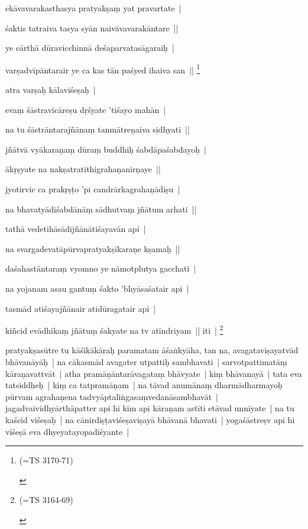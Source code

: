 \documentclass[article,12pt,a4paper]{memoir}
\begin{document}
	  \pstart ekāvavarakasthasya pratyakṣaṃ yat pravartate | 
	\pend
      

	  \pstart śaktis tatraiva tasya syān naivāvavarakāntare || 
	\pend
      

	  \pstart ye cārthā dūravicchinnā deśaparvatasāgaraiḥ | 
	\pend
      

	  \pstart varṣadvīpāntarair ye ca kas tān paśyed ihaiva san || \footnote{\begin{english}(=TS 3170-71)\end{english}}
	\pend
      

	  \pstart atra varṣaḥ kālaviśeṣaḥ | 
	\pend
      

	  \pstart evaṃ śāstravicāreṣu dṛśyate 'tiśayo mahān | 
	\pend
      

	  \pstart na tu śāstrāntarajñānaṃ tanmātreṇaiva sidhyati || 
	\pend
      

	  \pstart jñātvā vyākaraṇaṃ dūraṃ buddhiḥ śabdāpaśabdayoḥ | 
	\pend
      

	  \pstart ākṛṣyate na nakṣatratithigrahaṇanirṇaye || 
	\pend
      

	  \pstart jyotirvic ca prakṛṣṭo 'pi candrārkagrahaṇādiṣu | 
	\pend
      

	  \pstart na bhavatyādiśabdānāṃ sādhutvaṃ jñātum arhati || 
	\pend
      

	  \pstart tathā vedetihāsādijñānātiśayavān api | 
	\pend
      

	  \pstart na svargadevatāpūrvapratyakṣīkaraṇe kṣamaḥ || 
	\pend
      

	  \pstart daśahastāntaraṃ vyomno ye nāmotplutya gacchati | 
	\pend
      

	  \pstart na yojanam asau gantuṃ śakto 'bhyāsaśatair api | 
	\pend
      

	  \pstart tasmād atiśayajñānair atidūragatair api | 
	\pend
      

	  \pstart kiñcid evādhikaṃ jñātuṃ śakyate na tv atīndriyam || iti | \footnote{\begin{english}(=TS 3164-69)\end{english}}
	\pend
      

	  \pstart pratyakṣasūtre tu kāśikākāraḥ paramatam āśaṅkyāha, tan na, avagataviṣayatvād bhāvanāyāḥ | na cākasmād avagater utpattiḥ sambhavati | sarvotpattimatāṃ kāraṇavattvāt | atha pramāṇāntarāvagataṃ bhāvyate | kiṃ bhāvanayā | tata eva tatsiddheḥ | kiṃ ca tatpramāṇam | na tāvad anumānaṃ dharmādharmayoḥ pūrvam agrahaṇena tadvyāptaliṅgasaṃvedanāsambhavāt | jagadvaividhyārthāpatter api hi kim api kāraṇam astīti etāvad unnīyate | na tu kaścid viśeṣaḥ | na cānirdiṣṭaviśeṣaviṣayā bhāvanā bhavati | yogaśāstreṣv api hi viśeṣā eva dhyeyatayopadiśyante | 
	\pend
      
\end{document}
